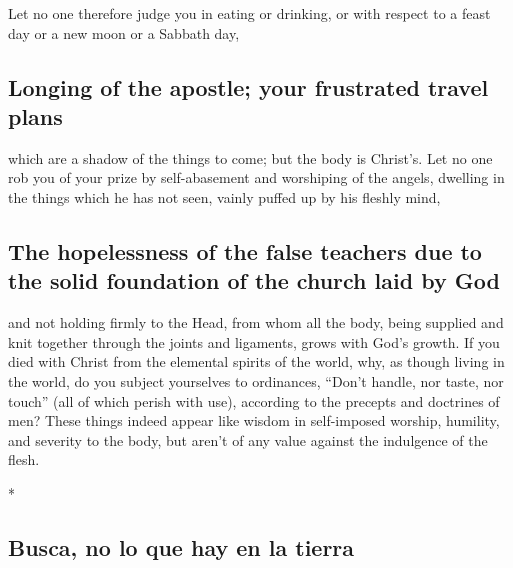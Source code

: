 \begin{paracol}{2}
\begin{otherlanguage}{english}
 Let no one therefore judge you in eating or drinking, or
with respect to a feast day or a new moon or a Sabbath day,

\hypertarget{longing-of-the-apostle-your-frustrated-travel-plans}{%
\subsection{Longing of the apostle; your frustrated travel
plans}\label{longing-of-the-apostle-your-frustrated-travel-plans}}

 which are a shadow of the things to come; but the body
is Christ's.  Let no one rob you of your prize by
self-abasement and worshiping of the angels, dwelling in the things
which he has not seen, vainly puffed up by his fleshly mind,

\hypertarget{the-hopelessness-of-the-false-teachers-due-to-the-solid-foundation-of-the-church-laid-by-god}{%
\subsection{The hopelessness of the false teachers due to the solid
foundation of the church laid by
God}\label{the-hopelessness-of-the-false-teachers-due-to-the-solid-foundation-of-the-church-laid-by-god}}

 and not holding firmly to the Head, from whom all the
body, being supplied and knit together through the joints and ligaments,
grows with God's growth.  If you died with Christ from
the elemental spirits of the world, why, as though living in the world,
do you subject yourselves to ordinances,  ``Don't handle,
nor taste, nor touch''  (all of which perish with use),
according to the precepts and doctrines of men?  These
things indeed appear like wisdom in self-imposed worship, humility, and
severity to the body, but aren't of any value against the indulgence of
the flesh.

\end{otherlanguage}

\switchcolumn[0]*

\hypertarget{busca-no-lo-que-hay-en-la-tierra}{%
\subsection{Busca, no lo que hay en la
tierra}\label{busca-no-lo-que-hay-en-la-tierra}}

\hypertarget{section-4}{%
}
\end{paracol}
